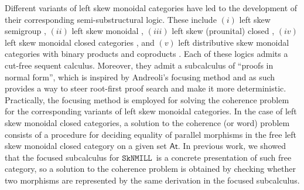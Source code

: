 \documentclass[sn-mathphys-num]{sn-jnl}%
\newcommand{\SkNMILL}{$\mathtt{SkNMILL}$}
\theoremstyle{thmstyleone}%
\theoremstyle{thmstyletwo}%
\theoremstyle{thmstylethree}%
\begin{document}
Different variants of left skew monoidal categories have led to the development of their corresponding semi-substructural logic.
These include $(i)$ left skew semigroup \cite{zeilberger:semiassociative:19}, $(ii)$ left skew monoidal \cite{uustalu:sequent:2021}, $(iii)$ left skew (prounital) closed \cite{uustalu:deductive:nodate}, $(iv)$ left skew monoidal closed categories \cite{UVW:protsn,veltri:multifocus:23,wan2024}, and $(v)$ left distributive skew monoidal categories with binary products and coproducts \cite{VW:2023}.
Each of these logics admits a cut-free sequent calculus. Moreover, they admit a subcalculus of ``proofs in normal form'', which is inspired by Andreoli's focusing method \cite{andreoli:logic:1992} and as such provides a way to steer root-first proof search and make it more deterministic.
Practically, the focusing method is employed for solving the coherence problem for the corresponding variants of left skew monoidal categories. In the case of left skew monoidal closed categories, a solution to the coherence (or word) problem consists of a procedure for deciding equality of parallel morphisms in the free left skew monoidal closed category on a given set $\mathsf{At}$.
In previous work, we showed that the focused subcalculus for \SkNMILL\ is a concrete presentation of such free category, so a solution to the coherence problem is obtained by checking whether two morphisms are represented by the same derivation in the focused subcalculus.
\end{document}
